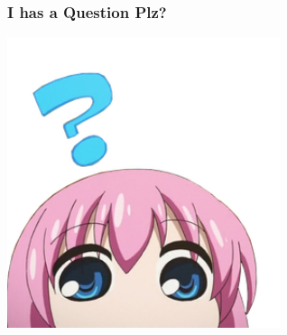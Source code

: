 \documentclass[aspectratio=169]{beamer}
\begin{document}
{
\begin{frame}
  \frametitle{I has a Question Plz?}
  \begin{center}
    \includegraphics[width=8cm]{anime-confused}
  \end{center}
\end{frame}
}
\end{document}
